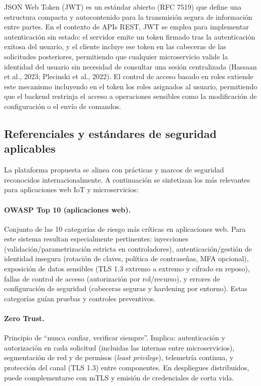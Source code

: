 \documentclass[12pt,a4paper,oneside]{report}
\begin{document}
JSON Web Token (JWT) es un estándar abierto (RFC 7519) que define una estructura compacta y autocontenido para la transmisión segura de información entre partes. En el contexto de APIs REST, JWT se emplea para implementar autenticación sin estado: el servidor emite un token firmado tras la autenticación exitosa del usuario, y el cliente incluye ese token en las cabeceras de las solicitudes posteriores, permitiendo que cualquier microservicio valide la identidad del usuario sin necesidad de consultar una sesión centralizada (Hassaan et al., 2023; Plecinski et al., 2022). El control de acceso basado en roles extiende este mecanismo incluyendo en el token los roles asignados al usuario, permitiendo que el backend restrinja el acceso a operaciones sensibles como la modificación de configuración o el envío de comandos.

\subsection{Referenciales y estándares de seguridad aplicables}\label{referenciales-seguridad}

La plataforma propuesta se alinea con prácticas y marcos de seguridad reconocidos internacionalmente. A continuación se sintetizan los más relevantes para aplicaciones web IoT y microservicios:

\paragraph{OWASP Top 10 (aplicaciones web).} Conjunto de las 10 categorías de riesgo más críticas en aplicaciones web. Para este sistema resultan especialmente pertinentes: inyecciones (validación/parametrización estricta en controladores), autenticación/gestión de identidad insegura (rotación de claves, política de contraseñas, MFA opcional), exposición de datos sensibles (TLS 1.3 extremo a extremo y cifrado en reposo), fallas de control de acceso (autorización por rol/recurso), y errores de configuración de seguridad (cabeceras seguras y hardening por entorno). Estas categorías guían pruebas y controles preventivos.

\paragraph{Zero Trust.} Principio de “nunca confiar, verificar siempre”. Implica: autenticación y autorización en cada solicitud (incluidas las internas entre microservicios), segmentación de red y de permisos (\textit{least privilege}), telemetría continua, y protección del canal (TLS 1.3) entre componentes. En despliegues distribuidos, puede complementarse con mTLS y emisión de credenciales de corta vida.
\end{document}
